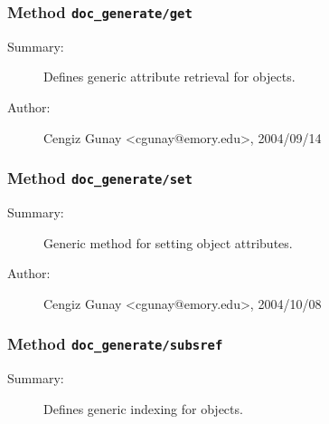 \subsubsection[Method \texttt{get}]{Method \texttt{doc\_generate/get}}%
%
\label{ref_doc_generate__get}%
\hypertarget{ref_doc_generate__get}{}%
\begin{description}
\item[Summary:]Defines generic attribute retrieval for objects.
%
%
%
%
%
%
%
\item[Author:]%
Cengiz Gunay <cgunay@emory.edu>, 2004/09/14%
\end{description}
\methodline%
\subsubsection[Method \texttt{set}]{Method \texttt{doc\_generate/set}}%
%
\label{ref_doc_generate__set}%
\hypertarget{ref_doc_generate__set}{}%
\begin{description}
\item[Summary:]Generic method for setting object attributes.
%
%
%
%
%
%
%
\item[Author:]%
Cengiz Gunay <cgunay@emory.edu>, 2004/10/08%
\end{description}
\methodline%
\subsubsection[Method \texttt{subsref}]{Method \texttt{doc\_generate/subsref}}%
%
\label{ref_doc_generate__subsref}%
\hypertarget{ref_doc_generate__subsref}{}%
\begin{description}
\item[Summary:]Defines generic indexing for objects.
%
%
%
%
%
%
%
%
\end{description}
\methodline%
